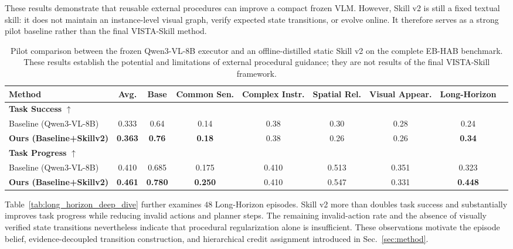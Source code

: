 These results demonstrate that reusable external procedures can improve a compact frozen VLM. However, Skill v2 is still a fixed textual skill: it does not maintain an instance-level visual graph, verify expected state transitions, or evolve online. It therefore serves as a strong pilot baseline rather than the final VISTA-Skill method.



\begin{table}[t]
    \centering
    \caption{Pilot comparison between the frozen Qwen3-VL-8B executor and an offline-distilled static Skill v2 on the complete EB-HAB benchmark. These results establish the potential and limitations of external procedural guidance; they are not results of the final VISTA-Skill framework.}
    \label{tab:main_results}
    \small
    \begin{tabular}{lcccccccc}
        \toprule
        \textbf{Method} & \textbf{Avg.} & \textbf{Base} & \textbf{Common Sen.} & \textbf{Complex Instr.} & \textbf{Spatial Rel.} & \textbf{Visual Appear.} & \textbf{Long-Horizon} \\
        \midrule
        \textbf{Task Success} $\uparrow$ & & & & & & & \\
        Baseline (Qwen3-VL-8B) & 0.333 & 0.64 & 0.14 & 0.38 & 0.30 & 0.28 & 0.24 \\
        \textbf{Ours (Baseline+Skillv2)} & \textbf{0.363} & \textbf{0.76} & \textbf{0.18} & 0.38 & 0.26 & 0.26 & \textbf{0.34} \\
        \midrule
        \textbf{Task Progress} $\uparrow$ & & & & & & & \\
        Baseline (Qwen3-VL-8B) & 0.410 & 0.685 & 0.175 & 0.410 & 0.513 & 0.351 & 0.323 \\
        \textbf{Ours (Baseline+Skillv2)} & \textbf{0.461} & \textbf{0.780} & \textbf{0.250} & 0.410 & 0.547 & 0.331 & \textbf{0.448} \\
        \bottomrule
    \end{tabular}
\end{table}

Table~\ref{tab:long_horizon_deep_dive} further examines $48$ Long-Horizon episodes. Skill v2 more than doubles task success and substantially improves task progress while reducing invalid actions and planner steps. The remaining invalid-action rate and the absence of visually verified state transitions nevertheless indicate that procedural regularization alone is insufficient. These observations motivate the episode belief, evidence-decoupled transition construction, and hierarchical credit assignment introduced in Sec.~\ref{sec:method}.

